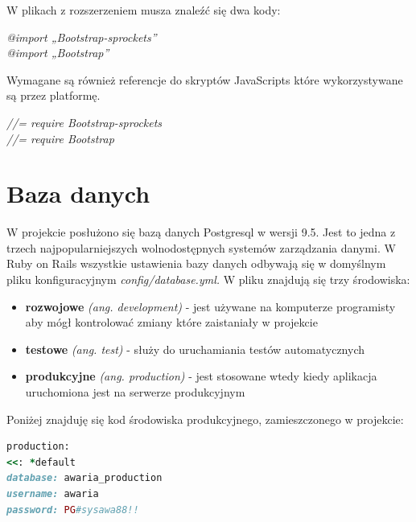 \documentclass[openright]{xmgr}
\begin{document}
	\begin{flushleft}
		W plikach z rozszerzeniem musza znaleźć się dwa kody:
	\end{flushleft}
	
	\textit{@import „Bootstrap-sprockets”\textbf{}}\\
	
	\textit{@import „Bootstrap”\textbf{}}\\
	
	
	
	\begin{flushleft}
		Wymagane są również referencje do skryptów JavaScripts które wykorzystywane są przez platformę.
	\end{flushleft}
	
	\textit{//= require Bootstrap-sprockets\textbf{}}\\
	
	\textit{//= require Bootstrap\textbf{}}\\
	
	\section{Baza danych}
	W projekcie posłużono się bazą danych Postgresql w wersji 9.5. Jest to jedna z trzech najpopularniejszych wolnodostępnych systemów zarządzania danymi. W Ruby on Rails wszystkie ustawienia bazy danych odbywają się w domyślnym pliku konfiguracyjnym \textit{config/database.yml.} W pliku znajdują się trzy środowiska:\\
	
	\begin{itemize}
		\item
	\textbf{rozwojowe} \textit{(ang. development)} - jest używane na komputerze programisty aby mógł kontrolować zmiany które zaistaniały w projekcie\\
	
	\item
	\textbf{testowe} \textit{(ang. test)} - służy do uruchamiania testów automatycznych\\
	
	\item
	\textbf{produkcyjne} \textit{(ang. production)} - jest stosowane wtedy kiedy aplikacja uruchomiona jest na serwerze produkcyjnym\\
\end{itemize}
	Poniżej znajduję się kod środowiska produkcyjnego, zamieszczonego w projekcie:\\
\begin{lstlisting}[language=Ruby,lineskip={-1pt},caption=Zawartość pliku \textit{database.yml}]
production:
<<: *default
database: awaria_production
username: awaria
password: PG#sysawa88!!
\end{lstlisting}
	
\end{document}
